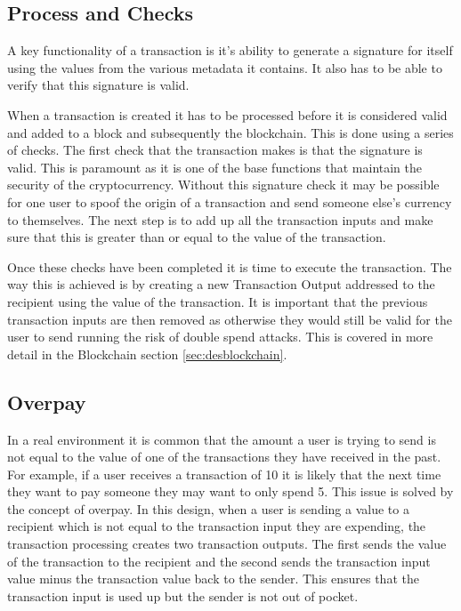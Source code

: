 \documentclass{l4proj}
\begin{document}
\subsection{Process and Checks}
A key functionality of a transaction is it's ability to generate a signature for itself using the values
from the various metadata it contains. It also has to be able to verify that this signature is valid.

When a transaction is created it has to be processed before it is considered valid and added to a block and subsequently
the blockchain. This is done using a series of checks. The first check that the transaction makes is that the
signature is valid. This is paramount as it is one of the base functions that maintain the security of the 
cryptocurrency. Without this signature check it may be possible for one user to spoof the origin of a transaction
and send someone else's currency to themselves. The next step is to add up all the transaction inputs
and make sure that this is greater than or equal to the value of the transaction.

Once these checks have been completed it is time to execute the transaction. The way this is achieved is by
creating a new Transaction Output addressed to the recipient using the value of the transaction. It is important
that the previous transaction inputs are then removed as otherwise they would still be valid for the user to send
running the risk of double spend attacks. This is covered in more detail in the Blockchain section \ref{sec:desblockchain}.

\subsection{Overpay}
In a real environment it is common that the amount a user is trying to send is not equal to the value of one of
the transactions they have received in the past. For example, if a user receives a transaction of 10 it is likely
that the next time they want to pay someone they may want to only spend 5. This issue is solved by the concept of
overpay. In this design, when a user is sending a value to a recipient which is not equal to the transaction
input they are expending, the transaction processing creates two transaction outputs. The first sends the value
of the transaction to the recipient and the second sends the transaction input value minus the transaction value
back to the sender. This ensures that the transaction input is used up but the sender is not out of pocket.
\end{document}
